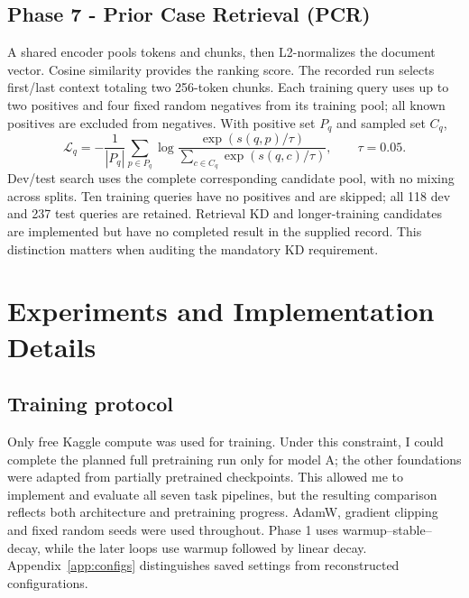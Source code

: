 \documentclass[11pt, oneside]{article}
\newcommand{\mainbreak}{\clearpage}
\begin{document}
\subsection{Phase 7 - Prior Case Retrieval (PCR)}
A shared encoder pools tokens and chunks, then L2-normalizes the document vector. Cosine similarity
provides the ranking score. The recorded run selects first/last context totaling two 256-token chunks.
Each training query uses up to two positives and four fixed random negatives from its training pool;
all known positives are excluded from negatives. With positive set $P_q$ and sampled set $C_q$,
\[
\mathcal L_q=-\frac1{|P_q|}\sum_{p\in P_q}\log
\frac{\exp(s(q,p)/\tau)}{\sum_{c\in C_q}\exp(s(q,c)/\tau)},\qquad\tau=0.05.
\]
Dev/test search uses the complete corresponding candidate pool, with no mixing across splits. Ten
training queries have no positives and are skipped; all 118 dev and 237 test queries are retained.
Retrieval KD and longer-training candidates are implemented but have no completed result in the supplied
record. This distinction matters when auditing the mandatory KD requirement.

\mainbreak
\section{Experiments and Implementation Details}
\subsection{Training protocol}
Only free Kaggle compute was used for training. Under this constraint, I could complete the planned
full pretraining run only for model A; the other foundations were adapted from partially pretrained
checkpoints. This allowed me to implement and evaluate all seven task pipelines, but the resulting
comparison reflects both architecture and pretraining progress. AdamW, gradient clipping and fixed
random seeds were used throughout. Phase 1 uses warmup--stable--decay, while the later loops use
warmup followed by linear decay. Appendix~\ref{app:configs} distinguishes saved settings from
reconstructed configurations.
\end{document}
